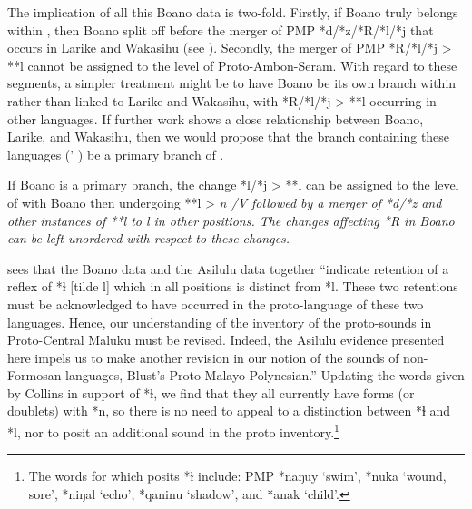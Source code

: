 
The implication of all this Boano data is two-fold.
Firstly, if Boano truly belongs within ,
then Boano split off before the merger of PMP *d/*z/*R/*l/*j
that occurs in Larike
and Wakasihu (see ).
Secondly, the merger of PMP *R/*l/*j > **l cannot be assigned
to the level of Proto-Ambon-Seram.
With regard to these segments,
a simpler treatment might be to have Boano be its own branch
within  rather than linked to Larike
and Wakasihu, with *R/*l/*j > **l occurring in other  languages.
If further work shows a close relationship between Boano,
Larike, and Wakasihu, then we would propose that the branch
containing these languages (\citeauthor{Collins1983}' ) be a primary
branch of .

If Boano is a primary branch,
the change *l/*j > **l can be assigned to the level of 
with Boano then undergoing **l > \it{n} /V\tsc{[+high]} followed
by a merger of *d/*z
and other instances of **l to \it{l} in other positions.
The changes affecting *R in Boano can be left unordered with
respect to these changes.

\citet[95--97]{Collins1983} sees that the Boano data
and the Asilulu data together “indicate retention of a reflex
of *ɫ [tilde l] which in all positions is distinct from *l.
These two retentions must be acknowledged to have occurred in
the proto-language of these two languages.
Hence, our understanding of the inventory of the proto-sounds
in Proto-Central Maluku must be revised.
Indeed, the Asilulu evidence presented here impels us to make
another revision in our notion of the sounds of non-Formosan
languages, Blust’s Proto-Malayo-Polynesian.” Updating the words given by
Collins in support of *ɫ,
we find that they all currently have forms (or doublets) with
*n, so there is no need to appeal to a distinction between *ɫ
and *l, nor to posit an additional sound in the proto inventory.\footnote{
		The words for which \citet[96--97]{Collins1983} posits *ɫ include:
		PMP *naŋuy ‘swim’, *nuka ‘wound, sore’, *niŋal ‘echo’, *qaninu ‘shadow’,
		and *anak ‘child’.} 
